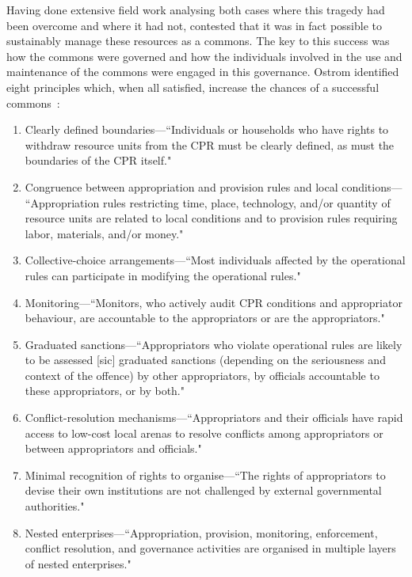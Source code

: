 Having done extensive field work analysing both cases where this tragedy had been overcome and where it had not, \citet{Ostrom1990} contested that it was in fact possible to sustainably manage these resources as a commons.
The key to this success was  how the commons were governed and how the individuals involved in the use and maintenance of the commons were engaged in this governance. 
Ostrom identified eight principles which, when all satisfied, increase the chances of a successful commons~\cite[pp.\ 91-101]{Ostrom1990}:
\begin{enumerate}
\item Clearly defined boundaries---``Individuals or households who have rights to withdraw resource units from the \ac{CPR} must be clearly defined, as must the boundaries of the \ac{CPR} itself."
\item Congruence between appropriation and provision rules and local conditions--- ``Appropriation rules restricting time, place, technology, and/or quantity of resource units are related to local conditions and to provision rules requiring labor, materials, and/or money."
\item Collective-choice arrangements---``Most individuals affected by the operational rules can participate in modifying the operational rules."
\item Monitoring---``Monitors, who actively audit \ac{CPR} conditions and appropriator behaviour, are accountable to the appropriators or are the appropriators."
\item Graduated sanctions---``Appropriators who violate operational rules are likely to be assessed [sic] graduated sanctions (depending on the seriousness and context of the offence) by other appropriators, by officials accountable to these appropriators, or by both."
\item Conflict-resolution mechanisms---``Appropriators and their officials have rapid access to low-cost local arenas to resolve conflicts among appropriators or between appropriators and officials."
\item Minimal recognition of rights to organise---``The rights of appropriators to devise their own institutions are not challenged by external governmental authorities."
\item Nested enterprises---``Appropriation, provision, monitoring, enforcement, conflict resolution, and governance activities are organised in multiple layers of nested enterprises."
\end{enumerate}

